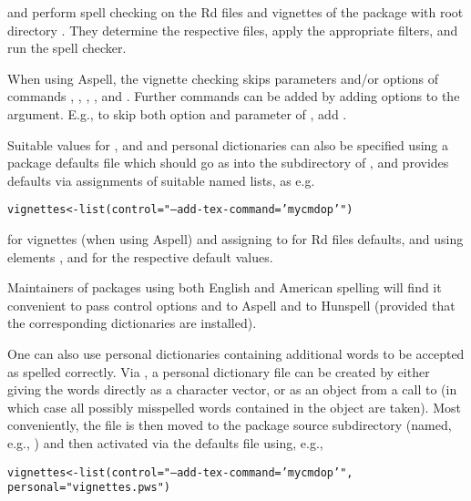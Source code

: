 %
\begin{Details}\relax
{} and 
perform spell checking on the Rd files and vignettes of the package
with root directory .  They determine the respective files,
apply the appropriate filters, and run the spell checker.

When using Aspell, the vignette checking skips parameters and/or
options of commands , , ,
,  and .  Further commands can
be added by adding  options to the
 argument.  E.g., to skip both option and parameter of
, add .

Suitable values for ,  and  and
personal dictionaries can also be specified using a package defaults
file which should go as  into the 
subdirectory of , and provides defaults via assignments of
suitable named lists, as e.g. \begin{alltt}  vignettes <- list(control = "--add-tex-command='mycmd op'")\end{alltt}

for vignettes (when using Aspell) and assigning to  for
Rd files defaults, and using elements ,  and
 for the respective default values.

Maintainers of packages using both English and American spelling will
find it convenient to pass control options  and
 to Aspell and 
to Hunspell (provided that the corresponding dictionaries are
installed).

One can also use personal dictionaries containing additional words to
be accepted as spelled correctly.  Via
, a personal dictionary
file can be created by either giving the words directly as a character
vector, or as an object from a call to  (in which case
all possibly misspelled words contained in the object are taken).
Most conveniently, the file is then moved to the package source
 subdirectory (named, e.g., ) and
then activated via the defaults file using, e.g., \begin{alltt}  vignettes <- list(control = "--add-tex-command='mycmd op'",
                    personal = "vignettes.pws")\end{alltt}

\end{Details}
